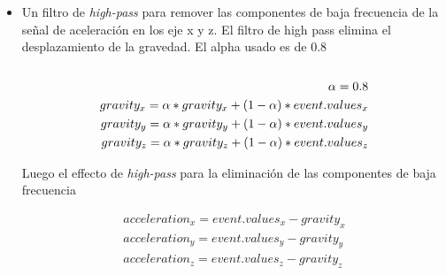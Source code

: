 \begin{itemize}
	\item  Un filtro de \emph{high-pass} para remover las componentes de baja frecuencia de la señal de aceleración en los eje x y z.  El filtro de high pass elimina el desplazamiento de la gravedad.
	El alpha usado es de 0.8 \\\\
	\begin{align*}
		\alpha = 0.8 \\
		gravity_{x} = \alpha * gravity_x + (1-\alpha) *event.values_{x} \notag\\
		gravity_{y} = \alpha * gravity_y + (1-\alpha) *event.values_{y} \notag\\
		gravity_{z} = \alpha * gravity_z + (1-\alpha) *event.values_{z} \notag\\	
	\end{align*}
			
	Luego el effecto de \emph{high-pass} para la eliminación de las componentes de baja frecuencia
	
	\begin{align*}
		acceleration_{x} =  event.values_{x} - gravity_{x}\\
		acceleration_{y} = event.values_{y} - gravity_{y}\\
		acceleration_{z} = event.values_{z} - gravity_{z}
	\end{align*}


\end{itemize}

